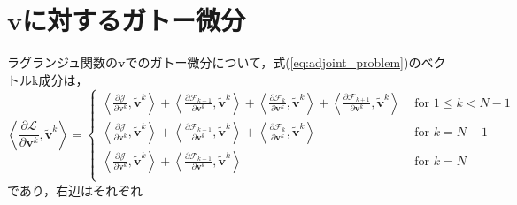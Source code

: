 \documentclass[a4paper,xelatex,ja=standard]{bxjsarticle}
\begin{document}
\section{$\mathbf{v}$に対するガトー微分}

ラグランジュ関数の$\mathbf{v}$でのガトー微分について，式(\ref{eq:adjoint_problem})のベクトルk成分は，
\begin{equation}
    \label{eq:adjoint_vdd}
    \left\langle\frac{\partial \mathcal{L}}{\partial \mathbf{v}^k}, \tilde{\mathbf{v}}^k\right\rangle
    = \begin{cases}
      \displaystyle \left\langle\frac{\partial \mathcal{J}}{\partial \mathbf{v}^{k}}, \tilde{\mathbf{v}}^{k}\right\rangle
      + \displaystyle \left\langle\frac{\partial \mathcal{F}_{k-1}}{\partial \mathbf{v}^{k}}, \tilde{\mathbf{v}}^{k}\right\rangle
      + \displaystyle \left\langle\frac{\partial \mathcal{F}_{k}}{\partial \mathbf{v}^{k}}, \tilde{\mathbf{v}}^{k}\right\rangle
      + \displaystyle \left\langle\frac{\partial \mathcal{F}_{k+1}}{\partial \mathbf{v}^{k}}, \tilde{\mathbf{v}}^{k}\right\rangle 
      & \text { for } 1 \leq k<N-1 \\[12pt]
      \displaystyle \left\langle\frac{\partial \mathcal{J}}{\partial \mathbf{v}^{k}}, \tilde{\mathbf{v}}^{k}\right\rangle
      + \displaystyle \left\langle\frac{\partial \mathcal{F}_{k-1}}{\partial \mathbf{v}^{k}}, \tilde{\mathbf{v}}^{k}\right\rangle
      + \displaystyle \left\langle\frac{\partial \mathcal{F}_{k}}{\partial \mathbf{v}^{k}}, \tilde{\mathbf{v}}^{k}\right\rangle
      & \text { for } k=N-1 \\[12pt]
      \displaystyle \left\langle\frac{\partial \mathcal{J}}{\partial \mathbf{v}^{k}}, \tilde{\mathbf{v}}^{k}\right\rangle
      + \displaystyle \left\langle\frac{\partial \mathcal{F}_{k-1}}{\partial \mathbf{v}^{k}}, \tilde{\mathbf{v}}^{k}\right\rangle
      & \text { for } k=N \\[12pt]
    \end{cases}
\end{equation}
であり，右辺はそれぞれ
\end{document}
